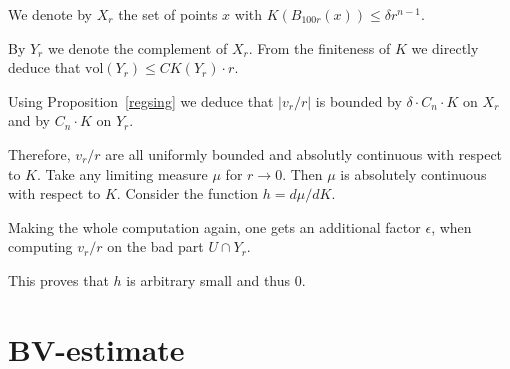 \documentclass[12pt,leqno]{amsart}
\numberwithin{equation}{section}
\newtheorem{prop}[thm]{PROPOSITION}
\theoremstyle{definition}
\newtheorem{defn}[thm]{Definition}%
\theoremstyle{remark}
\newcommand{\pref}[1]{Proposition~\ref{#1}}
\newcommand{\vol}{\mathrm{vol}}
\newcommand{\R}{\mathbb{R}}
\begin{document}
 We denote by $X_r$ the set of points $x$ with
$K(B_{100 r} (x)) \leq \delta r^{n-1}$.

 By $Y_r$ we denote the complement of $X_r$. From the finiteness of $K$ we directly deduce that $\vol (Y_r) \leq C K (Y_r) \cdot r $.

 Using \pref{regsing} we deduce that $|v_r /r|$ is bounded by $\delta \cdot C_n \cdot  K$
on $X_r$ and by  $C_n  \cdot K$ on $Y_r$.

 Therefore, $v_r /r$ are all uniformly bounded and absolutly continuous with respect to $K$.  Take any limiting measure $\mu$ for $r\to 0$.
Then $\mu$ is absolutely continuous with respect to  $K$. Consider the function
$h= d \mu /dK$.


 Making the whole computation again, one gets an additional factor $\epsilon$, when computing $v_r /r$
on the bad part $U \cap Y_r$.

This proves that $h$ is arbitrary small and thus $0$.










\section{BV-estimate}\label{sec-BV-estimate}
\end{document}
